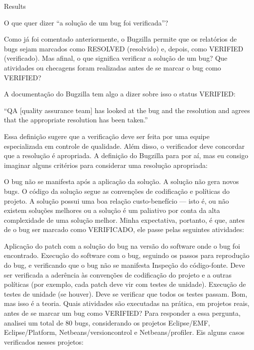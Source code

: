 \begin{section}{Results}

	O que quer dizer “a solução de um bug foi verificada”?

	Como já foi comentado anteriormente, o Bugzilla permite que os relatórios de bugs sejam marcados como RESOLVED (resolvido) e, depois, como VERIFIED (verificado). Mas afinal, o que significa verificar a solução de um bug? Que atividades ou checagens foram realizadas antes de se marcar o bug como VERIFIED?

	A documentação do Bugzilla tem algo a dizer sobre isso o status VERIFIED:

	“QA [quality assurance team] has looked at the bug and the resolution and agrees that the appropriate resolution has been taken.”

	Essa definição sugere que a verificação deve ser feita por uma equipe especializada em controle de qualidade. Além disso, o verificador deve concordar que a resolução é apropriada. A definição do Bugzilla para por aí, mas eu consigo imaginar alguns critérios para considerar uma resolução apropriada:

	O bug não se manifesta após a aplicação da solução.
	A solução não gera novos bugs.
	O código da solução segue as convenções de codificação e políticas do projeto.
	A solução possui uma boa relação custo-benefício — isto é, ou não existem soluções melhores ou a solução é um paliativo por conta da alta complexidade de uma solução melhor.
	Minha expectativa, portanto, é que, antes de o bug ser marcado como VERIFICADO, ele passe pelas seguintes atividades:

	Aplicação do patch com a solução do bug na versão do software onde o bug foi encontrado.
	Execução do software com o bug, seguindo os passos para reprodução do bug, e verificando que o bug não se manifesta
	Inspeção do código-fonte. Deve ser verificada a aderência às convenções de codificação do projeto e a outras políticas (por exemplo, cada patch deve vir com testes de unidade).
	Execução de testes de unidade (se houver). Deve se verificar que todos os testes passam.
	Bom, mas isso é a teoria. Quais atividades são executadas na prática, em projetos reais, antes de se marcar um bug como VERIFIED? Para responder a essa pergunta, analisei um total de 80 bugs, considerando os projetos Eclipse/EMF, Eclipse/Platform, Netbeans/versioncontrol e Netbeans/profiler. Eis alguns casos verificados nesses projetos:


\end{section}
